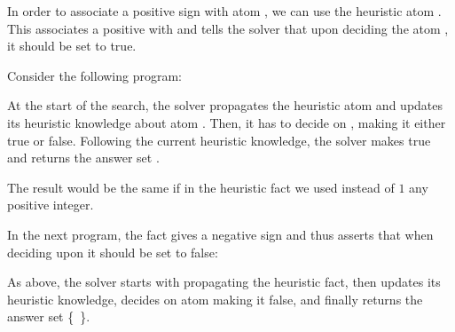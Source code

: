 In order to associate a positive sign with atom , we can use the heuristic atom . 
This associates a positive  with  and 
tells the solver that upon deciding the atom , it should be set to true.
\begin{example}
\label{example:psign}
Consider the following program:

At the start of the search, 
the solver propagates the heuristic atom 
and updates its heuristic knowledge about atom .
Then, it has to decide on , making it either true or false.
Following the current heuristic knowledge, 
the solver makes  true and returns the answer set .
\eexample
\end{example}

\begin{note}
The result would be the same if in the heuristic fact we used instead of $1$ any positive integer.
\end{note}

\begin{example}
\label{example:nsign}
In the next program,
the  fact gives  a negative sign 
and thus asserts that when deciding upon  it should be set to false:

As above,
the solver starts with propagating the heuristic fact,
then
updates its heuristic knowledge,
decides on atom  making it false, and 
finally 
returns the answer set \mbox{\{ \}}.
\eexample
\end{example}

